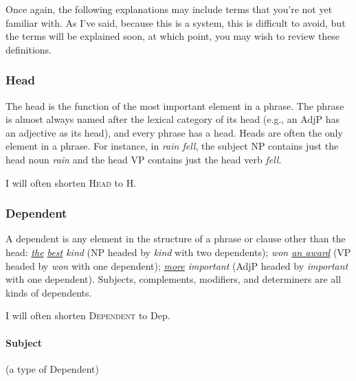 Once again, the following explanations may include terms that you're not yet familiar with. As I've said, because this is a system, this is difficult to avoid, but the terms will be explained soon, at which point, you may wish to review these definitions.

\subsubsection*{Head}\label{sec:head}

The head is the function of the most important element in a phrase. The phrase is almost always named after the lexical category of its head (e.g., an AdjP has an adjective as its head), and every phrase has a head. Heads are often the only element in a phrase. For instance, in \textit{rain fell}, the subject NP contains just the head noun \textit{rain} and the head VP contains just the head verb \textit{fell}.

I will often shorten \textsc{Head} to H.

\subsubsection*{Dependent}\label{sec:Dep}

A dependent is any element in the structure of a phrase or clause other than the head: \textit{\uline{the} \uline{best} kind} (NP headed by \textit{kind} with two dependents); \textit{won \uline{an award}} (VP headed by \textit{won} with one dependent); \textit{\uline{more} important} (AdjP headed by \textit{important} with one dependent). Subjects, complements, modifiers, and determiners are all kinds of dependents.

I will often shorten \textsc{Dependent} to Dep.

\paragraph*{Subject} \label{sec:subjects} (a type of Dependent)


